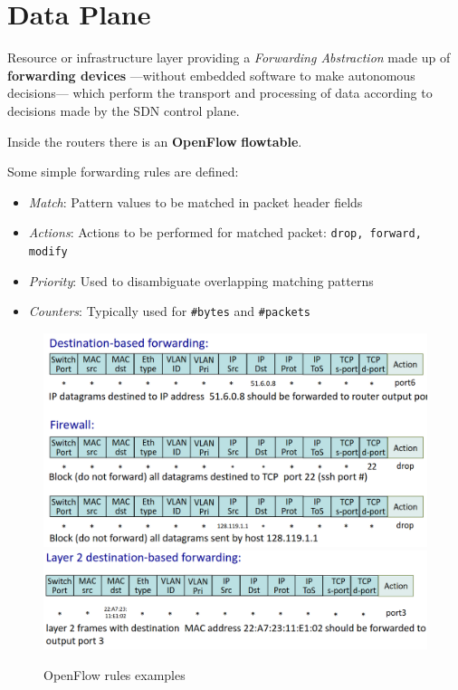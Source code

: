 \newpage
\section{Data Plane}
Resource or infrastructure layer providing a \textit{Forwarding Abstraction} made up of \textbf{forwarding devices} ---without embedded software to make autonomous decisions--- which perform the transport and processing of data according to decisions made by the SDN control plane.

Inside the routers there is an \textbf{OpenFlow} \textbf{flow\footnotemark[1] table}.
\begin{paracol}{2}
   Some simple forwarding rules are defined:
   \begin{itemize}
      \item \textit{Match}:
      Pattern values to be matched in packet header fields
      \item \textit{Actions}:
      Actions to be performed for matched packet: \texttt{drop, forward, modify} 
      \item \textit{Priority}:
      Used to disambiguate overlapping matching patterns
      \item \textit{Counters}:
      Typically used for \texttt{\#bytes} and \texttt{\#packets}   
   \end{itemize}

   \switchcolumn
   \begin{figure}[htbp]
      \centering
      \includegraphics{images/openflow_rulesexamples.png}\\
      \includegraphics{images/openflow_rulesexamples1.png}
      \caption{OpenFlow rules examples}
      \label{fig:openflow_rulesexamples}
   \end{figure}
\end{paracol}

